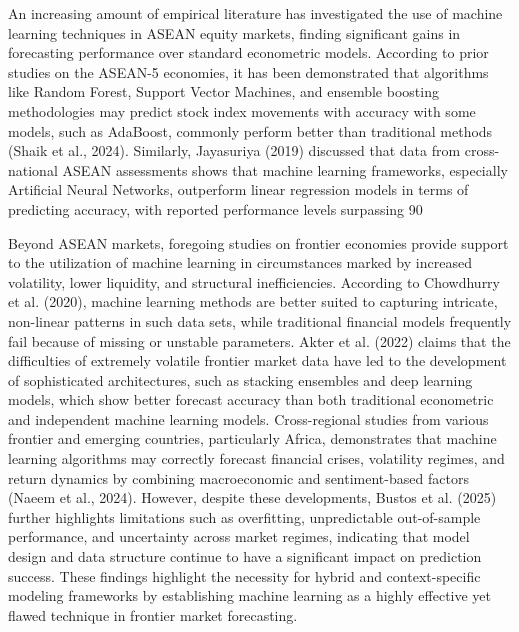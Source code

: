\documentclass[12pt]{article}
\begin{document}
An increasing amount of empirical literature has investigated the use of machine learning techniques in ASEAN equity markets, finding significant gains in forecasting performance over standard econometric models. According to prior studies on the ASEAN-5 economies, it has been demonstrated that algorithms like Random Forest, Support Vector Machines, and ensemble boosting methodologies may predict stock index movements with accuracy with some models, such as AdaBoost, commonly perform better than traditional methods (Shaik et al., 2024). Similarly, Jayasuriya (2019) discussed that data from cross-national ASEAN assessments shows that machine learning frameworks, especially Artificial Neural Networks, outperform linear regression models in terms of predicting accuracy, with reported performance levels surpassing 90%

Beyond ASEAN markets, foregoing studies on frontier economies provide support to the utilization of machine learning in circumstances marked by increased volatility, lower liquidity, and structural inefficiencies. According to Chowdhurry et al. (2020), machine learning methods are better suited to capturing intricate, non-linear patterns in such data sets, while traditional financial models frequently fail because of missing or unstable parameters. Akter et al. (2022) claims that the difficulties of extremely volatile frontier market data have led to the development of sophisticated architectures, such as stacking ensembles and deep learning models, which show better forecast accuracy than both traditional econometric and independent machine learning models. Cross-regional studies from various frontier and emerging countries, particularly Africa, demonstrates that machine learning algorithms may correctly forecast financial crises, volatility regimes, and return dynamics by combining macroeconomic and sentiment-based factors (Naeem et al., 2024). However, despite these developments, Bustos et al. (2025) further highlights limitations such as overfitting, unpredictable out-of-sample performance, and uncertainty across market regimes, indicating that model design and data structure continue to have a significant impact on prediction success. These findings highlight the necessity for hybrid and context-specific modeling frameworks by establishing machine learning as a highly effective yet flawed technique in frontier market forecasting.
\end{document}
